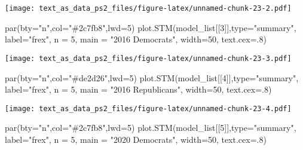 \documentclass[
]{article}
\newenvironment{Shaded}{\begin{snugshade}}{\end{snugshade}}
\newcommand{\AttributeTok}[1]{\textcolor[rgb]{0.77,0.63,0.00}{#1}}
\newcommand{\DecValTok}[1]{\textcolor[rgb]{0.00,0.00,0.81}{#1}}
\newcommand{\FunctionTok}[1]{\textcolor[rgb]{0.00,0.00,0.00}{#1}}
\newcommand{\NormalTok}[1]{#1}
\newcommand{\StringTok}[1]{\textcolor[rgb]{0.31,0.60,0.02}{#1}}
\begin{document}
\texttt{[image: text\_as\_data\_ps2\_files/figure-latex/unnamed-chunk-23-2.pdf]}

\begin{Shaded}
\begin{Highlighting}[]
\FunctionTok{par}\NormalTok{(}\AttributeTok{bty=}\StringTok{"n"}\NormalTok{,}\AttributeTok{col=}\StringTok{"\#2c7fb8"}\NormalTok{,}\AttributeTok{lwd=}\DecValTok{5}\NormalTok{)}
\FunctionTok{plot.STM}\NormalTok{(model\_list[[}\DecValTok{3}\NormalTok{]],}\AttributeTok{type=}\StringTok{"summary"}\NormalTok{, }\AttributeTok{label=}\StringTok{"frex"}\NormalTok{, }\AttributeTok{n =} \DecValTok{5}\NormalTok{, }\AttributeTok{main =} \StringTok{"2016 Democrats"}\NormalTok{, }
         \AttributeTok{width=}\DecValTok{50}\NormalTok{, }\AttributeTok{text.cex=}\NormalTok{.}\DecValTok{8}\NormalTok{)}
\end{Highlighting}
\end{Shaded}

\texttt{[image: text\_as\_data\_ps2\_files/figure-latex/unnamed-chunk-23-3.pdf]}

\begin{Shaded}
\begin{Highlighting}[]
\FunctionTok{par}\NormalTok{(}\AttributeTok{bty=}\StringTok{"n"}\NormalTok{,}\AttributeTok{col=}\StringTok{"\#de2d26"}\NormalTok{,}\AttributeTok{lwd=}\DecValTok{5}\NormalTok{)}
\FunctionTok{plot.STM}\NormalTok{(model\_list[[}\DecValTok{4}\NormalTok{]],}\AttributeTok{type=}\StringTok{"summary"}\NormalTok{, }\AttributeTok{label=}\StringTok{"frex"}\NormalTok{, }\AttributeTok{n =} \DecValTok{5}\NormalTok{, }\AttributeTok{main =} \StringTok{"2016 Republicans"}\NormalTok{, }
         \AttributeTok{width=}\DecValTok{50}\NormalTok{, }\AttributeTok{text.cex=}\NormalTok{.}\DecValTok{8}\NormalTok{)}
\end{Highlighting}
\end{Shaded}

\texttt{[image: text\_as\_data\_ps2\_files/figure-latex/unnamed-chunk-23-4.pdf]}

\begin{Shaded}
\begin{Highlighting}[]
\FunctionTok{par}\NormalTok{(}\AttributeTok{bty=}\StringTok{"n"}\NormalTok{,}\AttributeTok{col=}\StringTok{"\#2c7fb8"}\NormalTok{,}\AttributeTok{lwd=}\DecValTok{5}\NormalTok{)}
\FunctionTok{plot.STM}\NormalTok{(model\_list[[}\DecValTok{5}\NormalTok{]],}\AttributeTok{type=}\StringTok{"summary"}\NormalTok{, }\AttributeTok{label=}\StringTok{"frex"}\NormalTok{, }\AttributeTok{n =} \DecValTok{5}\NormalTok{, }\AttributeTok{main =} \StringTok{"2020 Democrats"}\NormalTok{, }
         \AttributeTok{width=}\DecValTok{50}\NormalTok{, }\AttributeTok{text.cex=}\NormalTok{.}\DecValTok{8}\NormalTok{)}
\end{Highlighting}
\end{Shaded}
\end{document}

